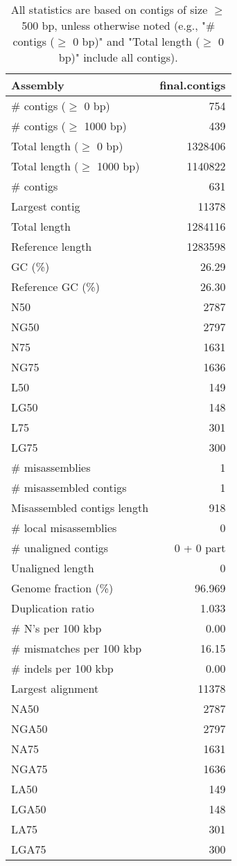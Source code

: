 \documentclass[12pt,a4paper]{article}
\begin{document}
\begin{table}[ht]
\begin{center}
\caption{All statistics are based on contigs of size $\geq$ 500 bp, unless otherwise noted (e.g., "\# contigs ($\geq$ 0 bp)" and "Total length ($\geq$ 0 bp)" include all contigs).}
\begin{tabular}{|l*{1}{|r}|}
\hline
Assembly & final.contigs \\ \hline
\# contigs ($\geq$ 0 bp) & 754 \\ \hline
\# contigs ($\geq$ 1000 bp) & 439 \\ \hline
Total length ($\geq$ 0 bp) & 1328406 \\ \hline
Total length ($\geq$ 1000 bp) & 1140822 \\ \hline
\# contigs & 631 \\ \hline
Largest contig & 11378 \\ \hline
Total length & 1284116 \\ \hline
Reference length & 1283598 \\ \hline
GC (\%) & 26.29 \\ \hline
Reference GC (\%) & 26.30 \\ \hline
N50 & 2787 \\ \hline
NG50 & 2797 \\ \hline
N75 & 1631 \\ \hline
NG75 & 1636 \\ \hline
L50 & 149 \\ \hline
LG50 & 148 \\ \hline
L75 & 301 \\ \hline
LG75 & 300 \\ \hline
\# misassemblies & 1 \\ \hline
\# misassembled contigs & 1 \\ \hline
Misassembled contigs length & 918 \\ \hline
\# local misassemblies & 0 \\ \hline
\# unaligned contigs & 0 + 0 part \\ \hline
Unaligned length & 0 \\ \hline
Genome fraction (\%) & 96.969 \\ \hline
Duplication ratio & 1.033 \\ \hline
\# N's per 100 kbp & 0.00 \\ \hline
\# mismatches per 100 kbp & 16.15 \\ \hline
\# indels per 100 kbp & 0.00 \\ \hline
Largest alignment & 11378 \\ \hline
NA50 & 2787 \\ \hline
NGA50 & 2797 \\ \hline
NA75 & 1631 \\ \hline
NGA75 & 1636 \\ \hline
LA50 & 149 \\ \hline
LGA50 & 148 \\ \hline
LA75 & 301 \\ \hline
LGA75 & 300 \\ \hline
\end{tabular}
\end{center}
\end{table}
\end{document}
